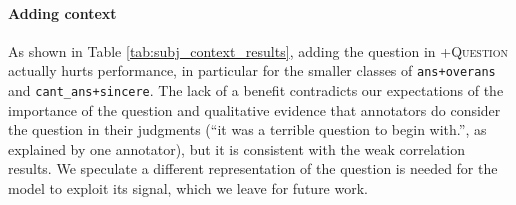 \begin{table}[]
    \centering
    \caption{Model predictions, with incorrect labels in {\color{red}{red}}. In this example, taking into account the hierarchy eliminates labels for the absent conversation act of `answer'. (Not shown, adding the question does not change these predictions). Adding the sentiment corrects the false positive for the negative intent of lying, predicting the entire label set correctly.}
    \label{tab:pred_models}

\end{table}
\paragraph{Adding context} As shown in Table \ref{tab:subj_context_results}, adding the question in \textsc{+Question} actually hurts performance, in particular for the smaller classes of \texttt{ans+overans} and \texttt{cant\_ans+sincere}. The lack of a benefit contradicts our expectations of the importance of the question and qualitative evidence that annotators do consider the question in their judgments (``it was a terrible question to begin with.'', as explained by one annotator), but it is consistent with the weak correlation results. We speculate a different representation of the question is needed for the model to exploit its signal, which we leave for future work.

